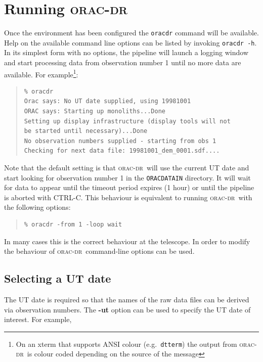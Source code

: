 \documentclass[twoside,11pt]{article}
\newcommand{\xref}[3]{#1}
\newcommand{\xlabel}[1]{}
\renewcommand{\_}{\texttt{\symbol{95}}}
\newcommand{\oracdr}{\xref{\textsc{orac-dr}}{sun230}{}}
\newenvironment{myquote}{\begin{quote}\begin{small}}{\end{small}\end{quote}}
\begin{document}
\section{Running \oracdr\xlabel{running_orac_dr}}

Once the environment has been configured the \texttt{oracdr} command
will be available. Help on the available command line options 
can be listed by invoking \texttt{oracdr -h}. In its simplest
form with no options, the pipeline will launch a logging window and 
start processing data from observation number 1 until no more data are
available. For example\footnote{On an xterm that supports ANSI colour (e.g.\
\texttt{dtterm}) the output from \oracdr\ is colour coded depending on the
source of the message}:

\begin{myquote}
\begin{verbatim}
% oracdr
Orac says: No UT date supplied, using 19981001
ORAC says: Starting up monoliths...Done
Setting up display infrastructure (display tools will not
be started until necessary)...Done
No observation numbers supplied - starting from obs 1
Checking for next data file: 19981001_dem_0001.sdf....
\end{verbatim}
\end{myquote}
Note that the default setting is that \oracdr\ will use the current UT
date and start looking for observation number 1 in the \texttt{ORAC\_DATA\_IN}
directory. It will wait for data to appear until the timeout period expires 
(1 hour) or until the pipeline is aborted with CTRL-C. This behaviour
is equivalent to running \oracdr\ with the following options:
\begin{myquote}
\begin{verbatim}
% oracdr -from 1 -loop wait
\end{verbatim}
\end{myquote}

In many cases this is the correct behaviour at the telescope. In order to
modify the behaviour of \oracdr\ command-line options can be used.

\subsection{Selecting a UT date\xlabel{selecting_a_ut_date}}

The UT date is required so that the names of the raw data files can be
derived via observation numbers. The \textbf{-ut} option can be used
to specify the UT date of interest. For example,
\end{document}
